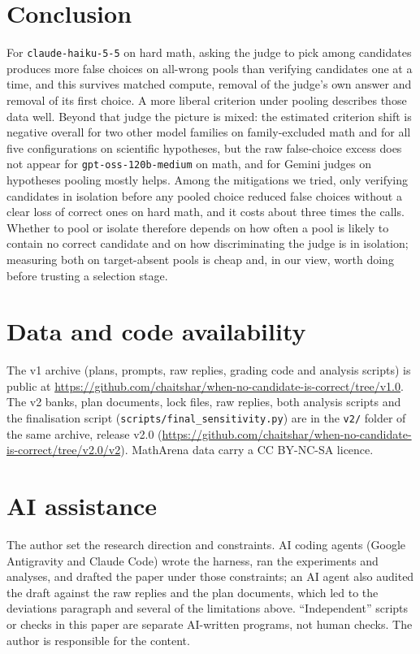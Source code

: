 \documentclass[10pt,twocolumn]{article}
\begin{document}
\section{Conclusion}
For \texttt{claude-haiku-5-5} on hard math, asking the judge to pick among candidates produces more false choices on all-wrong pools than verifying candidates one at a time, and this survives matched compute, removal of the judge's own answer and removal of its first choice. A more liberal criterion under pooling describes those data well. Beyond that judge the picture is mixed: the estimated criterion shift is negative overall for two other model families on family-excluded math and for all five configurations on scientific hypotheses, but the raw false-choice excess does not appear for \texttt{gpt-oss-120b-medium} on math, and for Gemini judges on hypotheses pooling mostly helps. Among the mitigations we tried, only verifying candidates in isolation before any pooled choice reduced false choices without a clear loss of correct ones on hard math, and it costs about three times the calls. Whether to pool or isolate therefore depends on how often a pool is likely to contain no correct candidate and on how discriminating the judge is in isolation; measuring both on target-absent pools is cheap and, in our view, worth doing before trusting a selection stage.

\section*{Data and code availability}
The v1 archive (plans, prompts, raw replies, grading code and analysis scripts) is public at \url{https://github.com/chaitshar/when-no-candidate-is-correct/tree/v1.0}. The v2 banks, plan documents, lock files, raw replies, both analysis scripts and the finalisation script (\texttt{scripts/final\_sensitivity.py}) are in the \texttt{v2/} folder of the same archive, release v2.0 (\url{https://github.com/chaitshar/when-no-candidate-is-correct/tree/v2.0/v2}). MathArena data carry a CC BY-NC-SA licence.

\section*{AI assistance}
The author set the research direction and constraints. AI coding agents (Google Antigravity and Claude Code) wrote the harness, ran the experiments and analyses, and drafted the paper under those constraints; an AI agent also audited the draft against the raw replies and the plan documents, which led to the deviations paragraph and several of the limitations above. ``Independent'' scripts or checks in this paper are separate AI-written programs, not human checks. The author is responsible for the content.



\end{document}
